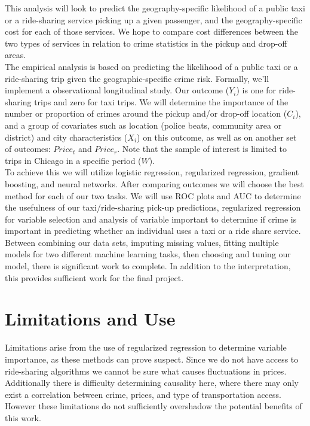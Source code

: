\documentclass[10pt]{article}
\begin{document}
This analysis will look to predict the geography-specific likelihood of a public taxi or a ride-sharing service picking up a given passenger, and the geography-specific cost for each of those services. We hope to compare cost differences between the two types of services in relation to crime statistics in the pickup and drop-off areas.\\

The empirical analysis is based on predicting the likelihood of a public taxi or a ride-sharing trip given the geographic-specific crime risk. Formally, we'll implement a observational longitudinal study. Our outcome ($Y_i$) is one for ride-sharing trips and zero for taxi trips. We will determine the importance of the number or proportion of crimes around the pickup and/or drop-off location ($C_i$), and a group of covariates such as location (police beats, community area or district) and city characteristics ($X_i$) on this outcome, as well as on another set of outcomes: $Price_t$ and $Price_r$. Note that the sample of interest is limited to trips in Chicago in a specific period ($W$). \\

To achieve this we will utilize logistic regression, regularized regression, gradient boosting, and neural networks. After comparing outcomes we will choose the best method for each of our two tasks. We will use ROC plots and AUC to determine the usefulness of our taxi/ride-sharing pick-up predictions, regularized regression for variable selection and analysis of variable important to determine if crime is important in predicting whether an individual uses a taxi or a ride share service. \\

Between combining our data sets, imputing missing values, fitting multiple models for two different machine learning tasks, then choosing and tuning our model, there is significant work to complete. In addition to the interpretation, this provides sufficient work for the final project. \\

\section{Limitations and Use}
Limitations arise from the use of regularized regression to determine variable importance, as these methods can prove suspect. Since we do not have access to ride-sharing algorithms we cannot be sure what causes fluctuations in prices. Additionally there is difficulty determining causality here, where there may only exist a correlation between crime, prices, and type of transportation access. However these limitations do not sufficiently overshadow the potential benefits of this work.\\
\end{document}
